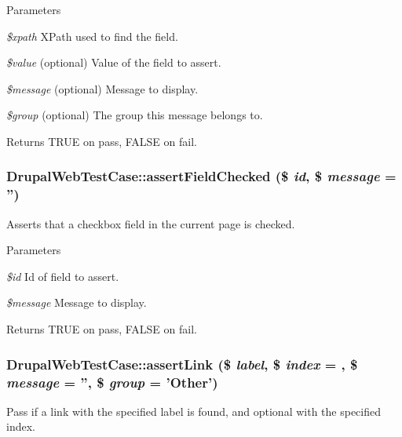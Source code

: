 \begin{DoxyParams}{Parameters}
\item[{\em \$xpath}]XPath used to find the field. \item[{\em \$value}](optional) Value of the field to assert. \item[{\em \$message}](optional) Message to display. \item[{\em \$group}](optional) The group this message belongs to.\end{DoxyParams}
\begin{DoxyReturn}{Returns}
TRUE on pass, FALSE on fail. 
\end{DoxyReturn}
\hypertarget{classDrupalWebTestCase_aea0ec61d9b9f476c5b23cb0111bda4b7}{
\subsubsection[{assertFieldChecked}]{\setlength{\rightskip}{0pt plus 5cm}DrupalWebTestCase::assertFieldChecked (\$ {\em id}, \/  \$ {\em message} = {\ttfamily ''})}}
\label{classDrupalWebTestCase_aea0ec61d9b9f476c5b23cb0111bda4b7}
Asserts that a checkbox field in the current page is checked.


\begin{DoxyParams}{Parameters}
\item[{\em \$id}]Id of field to assert. \item[{\em \$message}]Message to display. \end{DoxyParams}
\begin{DoxyReturn}{Returns}
TRUE on pass, FALSE on fail. 
\end{DoxyReturn}
\hypertarget{classDrupalWebTestCase_aa78cd0d7454235fcad55aaf14a77ed40}{
\subsubsection[{assertLink}]{\setlength{\rightskip}{0pt plus 5cm}DrupalWebTestCase::assertLink (\$ {\em label}, \/  \$ {\em index} = {}, \/  \$ {\em message} = {\ttfamily ''}, \/  \$ {\em group} = {\ttfamily 'Other'})}}
\label{classDrupalWebTestCase_aa78cd0d7454235fcad55aaf14a77ed40}
Pass if a link with the specified label is found, and optional with the specified index.


